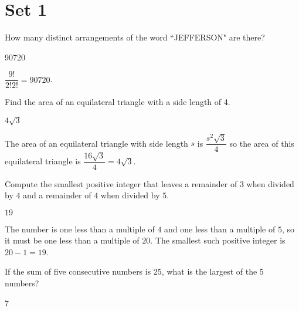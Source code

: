\documentclass[11pt]{article}
\begin{document}
\section*{Set 1}

\begin{problem}%
How many distinct arrangements of the word ``JEFFERSON" are there?
\end{problem}

\begin{answer}
90720
\end{answer}

\begin{solution}	
$\dfrac{9!}{2!2!} = 90720$.
\end{solution}


\begin{problem}
Find the area of an equilateral triangle with a side length of 4.
\end{problem}

\begin{answer}
$4\sqrt{3}$
\end{answer}

\begin{solution}
The area of an equilateral triangle with side length $s$ is $\dfrac{s^2\sqrt{3}}{4}$ so the area of this equilateral triangle is $\dfrac{16\sqrt{3}}{4} = 4\sqrt{3}$.
\end{solution}


\begin{problem}
Compute the smallest positive integer that leaves a remainder of $3$ when divided by $4$ and a remainder of $4$ when divided by $5$.
\end{problem}

\begin{answer}
$19$
\end{answer}

\begin{solution}
The number is one less than a multiple of $4$ and one less than a multiple of $5$, so it must be one less than a multiple of $20$. The smallest such positive integer is $20 - 1 = 19$.
\end{solution}


\begin{problem}%
If the sum of five consecutive numbers is 25, what is the largest of the 5 numbers?
\end{problem}

\begin{answer}
7
\end{answer}
\end{document}
